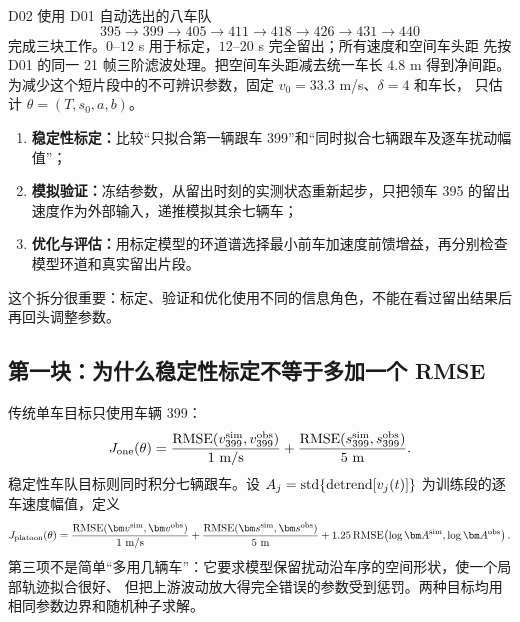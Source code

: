 \documentclass[11pt,a4paper,openany]{book}
\numberwithin{equation}{chapter}
\numberwithin{figure}{chapter}
\numberwithin{table}{chapter}
\begin{document}
D02 使用 D01 自动选出的八车队
\[
395\rightarrow399\rightarrow405\rightarrow411\rightarrow418
\rightarrow426\rightarrow431\rightarrow440
\]
完成三块工作。$0$--$12$ s 用于标定，$12$--$20$ s 完全留出；所有速度和空间车头距
先按 D01 的同一 21 帧三阶滤波处理。把空间车头距减去统一车长 $4.8$ m 得到净间距。
为减少这个短片段中的不可辨识参数，固定 $v_0=33.3$ m/s、$\delta=4$ 和车长，
只估计 $\theta=(T,s_0,a,b)$。

\begin{enumerate}[leftmargin=1.6em,itemsep=3pt]
\item \textbf{稳定性标定：}比较“只拟合第一辆跟车 399”和“同时拟合七辆跟车及逐车扰动幅值”；
\item \textbf{模拟验证：}冻结参数，从留出时刻的实测状态重新起步，只把领车 395 的留出速度作为外部输入，递推模拟其余七辆车；
\item \textbf{优化与评估：}用标定模型的环道谱选择最小前车加速度前馈增益，再分别检查模型环道和真实留出片段。
\end{enumerate}
这个拆分很重要：标定、验证和优化使用不同的信息角色，不能在看过留出结果后再回头调整参数。

\subsection{第一块：为什么稳定性标定不等于多加一个 RMSE}

传统单车目标只使用车辆 399：
\begin{equation}
J_{\rm one}(\theta)
=\frac{{\rm RMSE}(v_{399}^{\rm sim},v_{399}^{\rm obs})}{1\ {\rm m/s}}
+\frac{{\rm RMSE}(s_{399}^{\rm sim},s_{399}^{\rm obs})}{5\ {\rm m}}.
\label{eq:ngsim-single-objective}
\end{equation}
稳定性车队目标则同时积分七辆跟车。设
$A_j={\rm std}\{\operatorname{detrend}[v_j(t)]\}$ 为训练段的逐车速度幅值，定义
\begin{equation}
J_{\rm platoon}(\theta)
=\frac{{\rm RMSE}(\bm v^{\rm sim},\bm v^{\rm obs})}{1\ {\rm m/s}}
+\frac{{\rm RMSE}(\bm s^{\rm sim},\bm s^{\rm obs})}{5\ {\rm m}}
+1.25\,{\rm RMSE}\!\left(\log\bm A^{\rm sim},\log\bm A^{\rm obs}\right).
\label{eq:ngsim-platoon-objective}
\end{equation}
第三项不是简单“多用几辆车”：它要求模型保留扰动沿车序的空间形状，使一个局部轨迹拟合很好、
但把上游波动放大得完全错误的参数受到惩罚。两种目标均用相同参数边界和随机种子求解。
\end{document}
